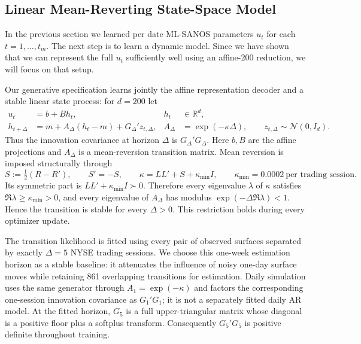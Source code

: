 \documentclass[11pt,a4paper]{article}
\newcommand{\R}{\mathbb{R}}
\begin{document}
\subsection{Linear Mean-Reverting State-Space Model}
\label{sec:affine-state-space-model}

In the previous section we learned per date ML-SANOS parameters $u_t$
for each $t=1,\dots,t_m$. The next step is to learn a dynamic model. Since we have shown that
we can represent the full $u_t$ sufficiently well using an affine-200 reduction, we will focus on that setup.

Our generative specification learns jointly the affine representation decoder and a stable linear state process:
for $d=200$ let
\begin{align}
  u_t&=b+B h_t,
       &h_t&\in\R^d,
       \label{eq:affine-decoder}\\
  h_{t+\Delta}
     &=m+A_\Delta(h_t-m)+G_\Delta' z_{t,\Delta},
       &A_\Delta&=\exp(-\kappa\Delta),
       \qquad z_{t,\Delta}\sim\mathcal N(0,I_d).
       \label{eq:affine-state-space-transition}
\end{align}
Thus the innovation covariance at horizon $\Delta$ is
$G_\Delta'G_\Delta$.  Here $b,B$ are the affine projections and
$A_\Delta$ is a mean-reversion transition matrix. Mean reversion is imposed
structurally through
\begin{equation}
  S:=\tfrac12(R-R'),\qquad S'=-S,\qquad
  \kappa=LL'+S+\kappa_{\min}I,
  \qquad \kappa_{\min}=0.0002\ \text{per trading session}.
  \label{eq:dissipative-generator}
\end{equation}
Its symmetric part is $LL'+\kappa_{\min}I\succ0$. Therefore every eigenvalue
$\lambda$ of $\kappa$ satisfies $\Re\lambda\geq\kappa_{\min}>0$, and every
eigenvalue of $A_\Delta$ has modulus
$\exp(-\Delta\Re\lambda)<1$.  Hence the transition is stable for every
$\Delta>0$.  This restriction holds during every optimizer update.

 The transition likelihood is fitted using every pair of observed surfaces separated by exactly
$\Delta=5$ NYSE trading sessions.  We choose this
one-week estimation horizon as a stable
baseline: it attenuates the influence of noisy one-day surface moves while
retaining 861 overlapping transitions for estimation.  Daily simulation uses
the same generator through $A_1=\exp(-\kappa)$ and factors the corresponding
one-session innovation covariance as $G_1'G_1$; it is not a separately fitted
daily AR model.  At the fitted horizon, $G_5$ is a
full upper-triangular matrix whose diagonal is a positive floor plus a
softplus transform.  Consequently $G_5'G_5$ is positive definite throughout
training.
\end{document}
